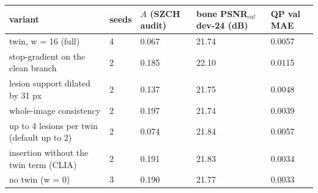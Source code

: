 \begin{tabular}{lllll}
\toprule
variant & seeds & $A$ (SZCH audit) & bone PSNR$_{cal}$ dev-24 (dB) & QP val MAE \\
\midrule
twin, w = 16 (full) & 4 & 0.067 & 21.74 & 0.0057 \\
stop-gradient on the clean branch & 2 & 0.185 & 22.10 & 0.0115 \\
lesion support dilated by 31 px & 2 & 0.137 & 21.75 & 0.0048 \\
whole-image consistency & 2 & 0.197 & 21.74 & 0.0039 \\
up to 4 lesions per twin (default up to 2) & 2 & 0.074 & 21.84 & 0.0057 \\
insertion without the twin term (CLIA) & 2 & 0.191 & 21.83 & 0.0034 \\
no twin (w = 0) & 3 & 0.190 & 21.77 & 0.0033 \\
\bottomrule
\end{tabular}
